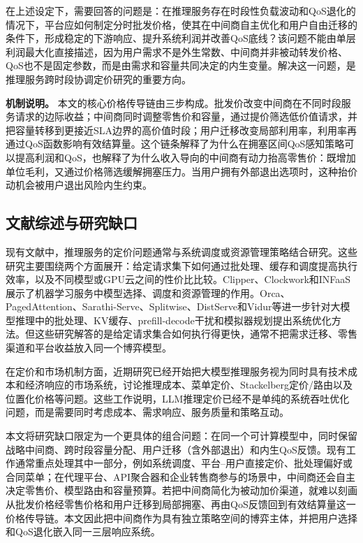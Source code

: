 \documentclass[UTF8,11pt]{ctexart}
\begin{document}
在上述设定下，需要回答的问题是：在推理服务存在时段性负载波动和QoS退化的情况下，平台应如何制定分时批发价格，使其在中间商自主优化和用户自由迁移的条件下，形成稳定的下游响应、提升系统利润并改善QoS底线？该问题不能由单层利润最大化直接描述，因为用户需求不是外生常数、中间商并非被动转发价格、QoS也不是固定参数，而是由需求和容量共同决定的内生变量。解决这一问题，是推理服务跨时段协调定价研究的重要方向。

\textbf{机制说明。} 本文的核心价格传导链由三步构成。批发价改变中间商在不同时段服务请求的边际收益；中间商同时调整零售价和容量，通过提价筛选低价值请求，并把容量转移到更接近SLA边界的高价值时段；用户迁移改变局部利用率，利用率再通过QoS函数影响有效结算量。这个链条解释了为什么在拥塞区间QoS感知策略可以提高利润和QoS，也解释了为什么收入导向的中间商有动力抬高零售价：既增加单位毛利，又通过价格筛选缓解拥塞压力。当用户拥有外部退出选项时，这种抬价动机会被用户退出风险内生约束。

\subsection{文献综述与研究缺口}
\label{sec:related_work}

现有文献中，推理服务的定价问题通常与系统调度或资源管理策略结合研究\cite{crankshaw2017clipper,yu2022orca,kwon2023pagedattention}。这些研究主要围绕两个方面展开：给定请求集下如何通过批处理、缓存和调度提高执行效率，以及不同模型或GPU云之间的性价比比较。Clipper、Clockwork和INFaaS展示了机器学习服务中模型选择、调度和资源管理的作用\cite{crankshaw2017clipper,gujarati2020clockwork,romero2021infaas}。Orca、PagedAttention、Sarathi-Serve、Splitwise、DistServe和Vidur等进一步针对大模型推理中的批处理、KV缓存、prefill-decode干扰和模拟器规划提出系统优化方法\cite{yu2022orca,kwon2023pagedattention,agrawal2024sarathiserve,patel2024splitwise,zhong2024distserve,agrawal2024vidur}。但这些研究解答的是给定请求集合如何执行得更快，通常不把需求迁移、零售渠道和平台收益放入同一个博弈模型。

在定价和市场机制方面，近期研究已经开始把大模型推理服务视为同时具有技术成本和经济响应的市场系统，讨论推理成本、菜单定价、Stackelberg定价/路由以及位置化价格等问题\cite{demirer2025emerging,erdil2025inference,bergemann2025menu}。这些工作说明，LLM推理定价已经不是单纯的系统吞吐优化问题，而是需要同时考虑成本、需求响应、服务质量和策略互动。

本文将研究缺口限定为一个更具体的组合问题：在同一个可计算模型中，同时保留战略中间商、跨时段容量分配、用户迁移（含外部退出）和内生QoS反馈。现有工作通常重点处理其中一部分，例如系统调度、平台--用户直接定价、批处理偏好或合同菜单；在代理平台、API聚合器和企业转售商参与的场景中，中间商还会自主决定零售价、模型路由和容量预算。若把中间商简化为被动加价渠道，就难以刻画从批发价格经零售价格和用户迁移到局部拥塞、再由QoS反馈回到有效结算量这一价格传导链。本文因此把中间商作为具有独立策略空间的博弈主体，并把用户选择和QoS退化嵌入同一三层响应系统。
\end{document}
